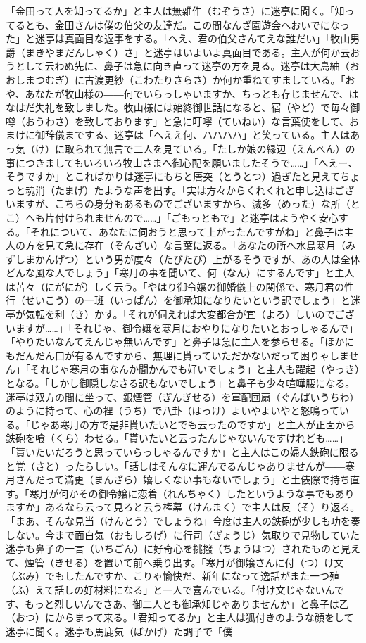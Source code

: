 \documentclass{book}
\begin{document}
「金田って人を知ってるか」と主人は無雑作（むぞうさ）に迷亭に聞く。「知ってるとも、金田さんは僕の伯父の友達だ。この間なんざ園遊会へおいでになった」と迷亭は真面目な返事をする。「へえ、君の伯父さんてえな誰だい」「牧山男爵（まきやまだんしゃく）さ」と迷亭はいよいよ真面目である。主人が何か云おうとして云わぬ先に、鼻子は急に向き直って迷亭の方を見る。迷亭は大島紬（おおしまつむぎ）に古渡更紗（こわたりさらさ）か何か重ねてすましている。「おや、あなたが牧山様の――何でいらっしゃいますか、ちっとも存じませんで、はなはだ失礼を致しました。牧山様には始終御世話になると、宿（やど）で毎々御噂（おうわさ）を致しております」と急に叮嚀（ていねい）な言葉使をして、おまけに御辞儀までする、迷亭は「へええ何、ハハハハ」と笑っている。主人はあっ気（け）に取られて無言で二人を見ている。「たしか娘の縁辺（えんぺん）の事につきましてもいろいろ牧山さまへ御心配を願いましたそうで\ldots{}\ldots{}」「へえー、そうですか」とこればかりは迷亭にもちと唐突（とうとつ）過ぎたと見えてちょっと魂消（たまげ）たような声を出す。「実は方々からくれくれと申し込はございますが、こちらの身分もあるものでございますから、滅多（めった）な所（とこ）へも片付けられませんので\ldots{}\ldots{}」「ごもっともで」と迷亭はようやく安心する。「それについて、あなたに伺おうと思って上がったんですがね」と鼻子は主人の方を見て急に存在（ぞんざい）な言葉に返る。「あなたの所へ水島寒月（みずしまかんげつ）という男が度々（たびたび）上がるそうですが、あの人は全体どんな風な人でしょう」「寒月の事を聞いて、何（なん）にするんです」と主人は苦々（にがにが）しく云う。「やはり御令嬢の御婚儀上の関係で、寒月君の性行（せいこう）の一斑（いっぱん）を御承知になりたいという訳でしょう」と迷亭が気転を利（き）かす。「それが伺えれば大変都合が宜（よろ）しいのでございますが\ldots{}\ldots{}」「それじゃ、御令嬢を寒月におやりになりたいとおっしゃるんで」「やりたいなんてえんじゃ無いんです」と鼻子は急に主人を参らせる。「ほかにもだんだん口が有るんですから、無理に貰っていただかないだって困りゃしません」「それじゃ寒月の事なんか聞かんでも好いでしょう」と主人も躍起（やっき）となる。「しかし御隠しなさる訳もないでしょう」と鼻子も少々喧嘩腰になる。迷亭は双方の間に坐って、銀煙管（ぎんぎせる）を軍配団扇（ぐんばいうちわ）のように持って、心の裡（うち）で八卦（はっけ）よいやよいやと怒鳴っている。「じゃあ寒月の方で是非貰いたいとでも云ったのですか」と主人が正面から鉄砲を喰（くら）わせる。「貰いたいと云ったんじゃないんですけれども\ldots{}\ldots{}」「貰いたいだろうと思っていらっしゃるんですか」と主人はこの婦人鉄砲に限ると覚（さと）ったらしい。「話しはそんなに運んでるんじゃありませんが――寒月さんだって満更（まんざら）嬉しくない事もないでしょう」と土俵際で持ち直す。「寒月が何かその御令嬢に恋着（れんちゃく）したというような事でもありますか」あるなら云って見ろと云う権幕（けんまく）で主人は反（そ）り返る。「まあ、そんな見当（けんとう）でしょうね」今度は主人の鉄砲が少しも功を奏しない。今まで面白気（おもしろげ）に行司（ぎょうじ）気取りで見物していた迷亭も鼻子の一言（いちごん）に好奇心を挑撥（ちょうはつ）されたものと見えて、煙管（きせる）を置いて前へ乗り出す。「寒月が御嬢さんに付（つ）け文（ぶみ）でもしたんですか、こりゃ愉快だ、新年になって逸話がまた一つ殖（ふ）えて話しの好材料になる」と一人で喜んでいる。「付け文じゃないんです、もっと烈しいんでさあ、御二人とも御承知じゃありませんか」と鼻子は乙（おつ）にからまって来る。「君知ってるか」と主人は狐付きのような顔をして迷亭に聞く。迷亭も馬鹿気（ばかげ）た調子で「僕
\end{document}
